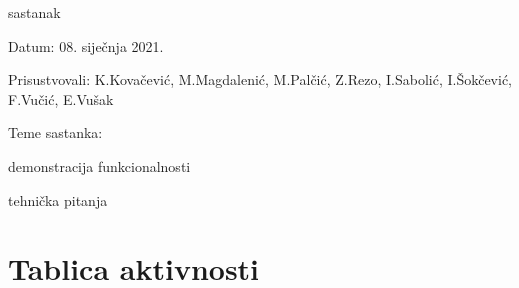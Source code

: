 \begin{packed_enum}
	\item sastanak
	\begin{packed_item}
		\item Datum: 08. siječnja 2021.
		\item Prisustvovali: K.Kovačević, M.Magdalenić, M.Palčić, Z.Rezo, I.Sabolić, I.Šokčević, F.Vučić, E.Vušak
		\item Teme sastanka:
		\begin{packed_item}
			\item  demonstracija funkcionalnosti
			\item  tehnička pitanja\\
		\end{packed_item}
	\end{packed_item}
	
	
\end{packed_enum}

\eject


\section{Tablica aktivnosti}



